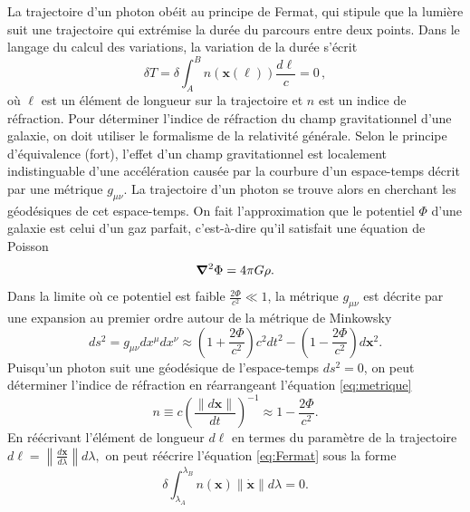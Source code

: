 La trajectoire d'un photon obéit au 
principe de Fermat, qui stipule que la lumière suit une trajectoire qui extrémise
la durée du parcours entre deux points. 
Dans le langage du calcul 
des variations, la variation de la durée s'écrit
\begin{equation}\label{eq:Fermat}
        \delta T =  \delta \int_{A}^{B} n(\mathbf{x}(\ell)) \frac{d\ell}{c}= 0\, ,
\end{equation}
où $\ell$ est un élément de longueur sur la trajectoire et $n$ est un indice de réfraction.
Pour déterminer l'indice de réfraction du champ gravitationnel d'une galaxie, 
on doit utiliser le formalisme de la relativité générale. Selon le principe 
d'équivalence (fort), 
l'effet d'un champ gravitationnel est localement 
indistinguable d'une accélération causée par la courbure 
d'un espace-temps décrit par 
une métrique $g_{\mu \nu}$. 
La trajectoire d'un photon se trouve alors en cherchant 
les géodésiques de cet espace-temps. 
On fait l'approximation 
que le potentiel $\Phi$ d'une galaxie est celui d'un gaz parfait, c'est-à-dire 
qu'il satisfait une équation de Poisson
\begin{equation}\label{eq:Poisson}
       \grad^{2}\Phi = 4\pi G \rho .
\end{equation} 
Dans la limite où ce potentiel est faible $\displaystyle \frac{2\Phi}{c^{2}} \ll 1$, la 
métrique $g_{\mu \nu}$ est décrite par une expansion au premier ordre autour de la 
métrique de Minkowsky %
\begin{equation}\label{eq:metrique}
        ds^2 = g_{\mu\nu}dx^{\mu}dx^{\nu} \approx \left( 1 + \frac{2\Phi}{c^{2}} \right)c^{2}dt^{2} - \left( 1 - \frac{2\Phi}{c^{2}} \right)d\mathbf{x}^{2}.
\end{equation} 
Puisqu'un photon suit une géodésique de l'espace-temps $ds^{2} = 0$, on peut déterminer 
l'indice de réfraction en réarrangeant l'équation \eqref{eq:metrique}
\begin{equation}\label{eq:n}
        n \equiv c \left( \frac{\lVert d \mathbf{x} \rVert}{dt}  \right)^{-1} \approx  1 - \frac{2\Phi}{c^{2}}.
\end{equation} 
En réécrivant l'élément de longueur $d\ell$ en termes du 
paramètre de la trajectoire
$
        d\ell = \left\lVert\frac{d  \mathbf{x} }{d\lambda} \right\rVert d\lambda,
$
on peut réécrire l'équation \eqref{eq:Fermat} sous la forme
\begin{equation}\label{eq:Fermat2}
        \delta \int_{\lambda_A}^{\lambda_B} n(\mathbf{x}) \lVert \mathbf{\dot{x}} \rVert d\lambda = 0.
\end{equation} 

